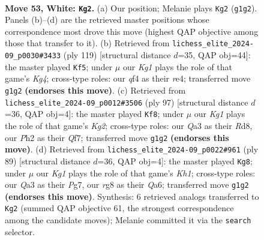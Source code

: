 \documentclass[11pt]{article}
\begin{document}
\clearpage

\begin{figure}[p]\centering
\begin{subfigure}{0.46\textwidth}\centering
\resizebox{\linewidth}{!}{%
\newchessgame
\chessboard[
  setfen={6r1/8/5p2/3p1k2/5q2/Q5P1/P6P/6K1 w - - 0 53},
  showmover=false,
  pgfstyle=straightmove, color=movearrow, markmove={g1-g2}
]}
\caption{}
\end{subfigure}\hfill
\begin{subfigure}{0.46\textwidth}\centering
\resizebox{\linewidth}{!}{%
\newchessgame
\chessboard[
  setfen={8/8/3q3p/p2p2k1/4R3/8/6P1/3R3K b - - 5 60},
  showmover=false,
  pgfstyle=straightmove, color=movearrow, markmove={g5-f5}
]}
\caption{}
\end{subfigure}
\\[4pt]
\begin{subfigure}{0.46\textwidth}\centering
\resizebox{\linewidth}{!}{%
\newchessgame
\chessboard[
  setfen={3r4/5qk1/1R3p2/4p3/6Q1/5p2/6P1/5K2 b - - 15 49},
  showmover=false,
  pgfstyle=straightmove, color=movearrow, markmove={g7-f8}
]}
\caption{}
\end{subfigure}\hfill
\begin{subfigure}{0.46\textwidth}\centering
\resizebox{\linewidth}{!}{%
\newchessgame
\chessboard[
  setfen={7k/p5p1/q3p2p/8/4Q3/1PR2K2/5P1P/8 b - - 0 45},
  showmover=false,
  pgfstyle=straightmove, color=movearrow, markmove={h8-g8}
]}
\caption{}
\end{subfigure}
\caption{\textbf{Move 53, White: \texttt{Kg2}.} (a) Our position; Melanie plays \texttt{Kg2} (\texttt{g1g2}). Panels (b)--(d) are the retrieved master positions whose correspondence most drove this move (highest QAP objective among those that transfer to it). (b) Retrieved from \texttt{lichess\_elite\_2024-09\_p0030\#3433} (ply 119) [structural distance $d$=35, QAP obj=44]: the master played \texttt{Kf5}; under $\mu$ our \emph{Kg1} plays the role of that game's \emph{Kg4}; cross-type roles: our \emph{q}f4 as their \emph{r}e4; transferred move \texttt{g1g2} \textbf{(endorses this move)}. (c) Retrieved from \texttt{lichess\_elite\_2024-09\_p0012\#3506} (ply 97) [structural distance $d$=36, QAP obj=4]: the master played \texttt{Kf8}; under $\mu$ our \emph{Kg1} plays the role of that game's \emph{Kg2}; cross-type roles: our \emph{Q}a3 as their \emph{R}d8, our \emph{P}h2 as their \emph{Q}f7; transferred move \texttt{g1g2} \textbf{(endorses this move)}. (d) Retrieved from \texttt{lichess\_elite\_2024-09\_p0022\#961} (ply 89) [structural distance $d$=36, QAP obj=4]: the master played \texttt{Kg8}; under $\mu$ our \emph{Kg1} plays the role of that game's \emph{Kh1}; cross-type roles: our \emph{Q}a3 as their \emph{P}g7, our \emph{r}g8 as their \emph{Q}a6; transferred move \texttt{g1g2} \textbf{(endorses this move)}. Synthesis: 6 retrieved analogs transferred to \texttt{Kg2} (summed QAP objective 61, the strongest correspondence among the candidate moves); Melanie committed it via the \texttt{search} selector.}
\label{fig:thought-m104}
\end{figure}
\end{document}
